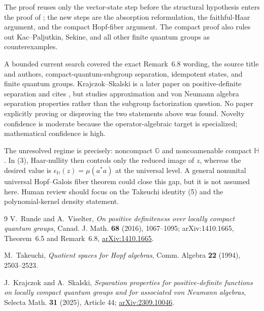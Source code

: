 \documentclass[11pt]{article}
\begin{document}
The proof reuses only the vector-state step before the structural hypothesis
enters the proof of \cite[Theorem~6.5]{RV}; the new steps are the absorption
reformulation, the faithful-Haar argument, and the compact Hopf-fiber
argument.  The compact proof also rules out Kac--Paljutkin, Sekine, and all
other finite quantum groups as counterexamples.

A bounded current search covered the exact Remark~6.8 wording, the source
title and authors, compact-quantum-subgroup separation, idempotent states,
and finite quantum groups.  Krajczok--Skalski \cite{KS} is a later paper on
positive-definite separation and cites \cite{RV}, but studies approximation
and von Neumann algebra separation properties rather than the subgroup
factorization question.  No paper explicitly proving or disproving the two
statements above was found.  Novelty confidence is moderate because the
operator-algebraic target is specialized; mathematical confidence is high.

The unresolved regime is precisely: noncompact $\mathbb G$ and noncoamenable
compact $\mathbb H$.  In (3), Haar-nullity then controls only the reduced
image of $z$, whereas the desired value is
$\epsilon_{\mathbb H}(z)=\mu(a^*a)$ at the universal level.  A general
nonunital universal Hopf--Galois fiber theorem could close this gap, but it is
not assumed here.  Human review should focus on the Takeuchi identity (5) and
the polynomial-kernel density statement.

\begin{thebibliography}{9}
V.~Runde and A.~Viselter,
\emph{On positive definiteness over locally compact quantum groups},
Canad. J. Math. \textbf{68} (2016), 1067--1095;
arXiv:1410.1665, Theorem~6.5 and Remark~6.8,
\href{https://arxiv.org/abs/1410.1665}{arXiv:1410.1665}.

M.~Takeuchi,
\emph{Quotient spaces for Hopf algebras},
Comm. Algebra \textbf{22} (1994), 2503--2523.

J.~Krajczok and A.~Skalski,
\emph{Separation properties for positive-definite functions on locally
compact quantum groups and for associated von Neumann algebras},
Selecta Math. \textbf{31} (2025), Article 44;
\href{https://arxiv.org/abs/2309.10046}{arXiv:2309.10046}.
\end{thebibliography}
\end{document}
